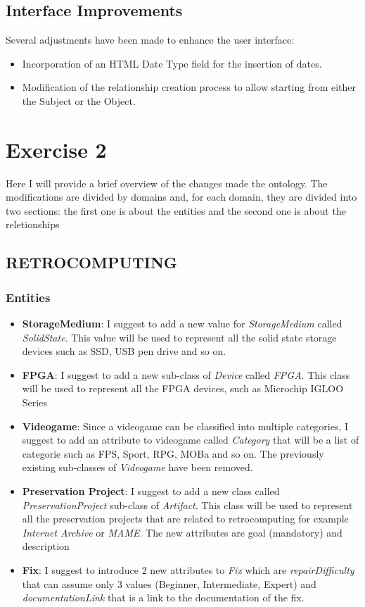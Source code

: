 \subsection{Interface Improvements}

Several adjustments have been made to enhance the user interface:

\begin{itemize}
    \item Incorporation of an HTML Date Type field for the insertion of dates.
    \item Modification of the relationship creation process to allow starting from either the Subject or the Object.
\end{itemize}


\section{Exercise 2}

Here I will provide a brief overview of the changes made the ontology. The modifications are divided by domains and, for each domain, they are divided into two sections: the first one is about the entities and the second one is about the reletionships
\subsection{RETROCOMPUTING}

\subsubsection{Entities}
\begin{itemize}
    \item \textbf{StorageMedium}: I suggest to add a new value for \textit{StorageMedium} called \textit{SolidState}. This value will be used to represent all the solid state storage devices such as SSD, USB pen drive and so on.
    \item \textbf{FPGA}: I suggest to add a new sub-class of \textit{Device} called \textit{FPGA}. This class will be used to represent all the FPGA devices, such as Microchip IGLOO Series
    \item \textbf{Videogame}: Since a videogame can be classified into multiple categories, I suggest to add an attribute to videogame called \textit{Category} that will be a list of categorie such as FPS, Sport, RPG, MOBa and so on. The previously existing sub-classes of \textit{Videogame} have been removed.
    \item \textbf{Preservation Project}: I suggest to add a new class called \textit{PreservationProject} sub-class of \textit{Artifact}. This class will be used to represent all the preservation projects that are related to retrocomputing for example \textit{Internet Archive} or \textit{MAME}. The new attributes are goal (mandatory) and description 
    \item \textbf{Fix}: I suggest to introduce 2 new attributes to \textit{Fix} which are \textit{repairDifficulty} that can assume only 3 values (Beginner, Intermediate, Expert) and \textit{documentationLink} that is a link to the documentation of the fix.
\end{itemize}

